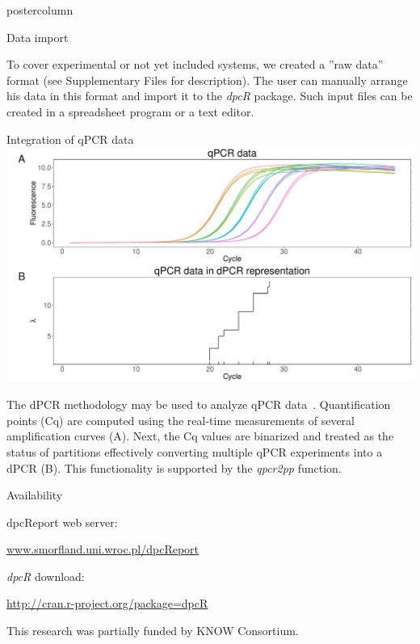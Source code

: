 \documentclass[final]{beamer}\usepackage[]{graphicx}\usepackage[]{color}
\makeatletter
\def\maxwidth{ %
  \ifdim\Gin@nat@width>\linewidth
    \linewidth
  \else
    \Gin@nat@width
  \fi
}
\newenvironment{knitrout}{}{} %
\makeatother
\begin{document}
\begin{frame}
\begin{columns}
\begin{column}{.46\textwidth}
\begin{beamercolorbox}[center,wd=\textwidth]{postercolumn}
\begin{minipage}[T]{.95\textwidth}
{\begin{block}{Data import}
\smallskip

To cover experimental or not yet included systems, we 
created a ''raw data'' format (see Supplementary Files for description). The 
user can manually arrange his data in this format and import it to the 
\textit{dpcR} package. Such input files can be created in a spreadsheet program 
or a text editor.

\end{block}
\vfill

\begin{block}{Integration of qPCR data}
\begin{knitrout}
\color{fgcolor}
\includegraphics[width=\maxwidth]{figure/qpcr2pp-1} 

\end{knitrout}

The dPCR methodology may be used to analyze qPCR data~\citep{mojtahedi_2014}.
Quantification points (Cq) are computed using the real-time measurements of 
several amplification curves (A). Next, the Cq values are binarized and treated as 
the status of partitions effectively converting multiple qPCR experiments into a 
dPCR (B). This functionality is supported by the \textit{qpcr2pp} function.
\end{block}
\vfill

\begin{block}{Availability}
\footnotesize{
dpcReport web server: 

\url{www.smorfland.uni.wroc.pl/dpcReport}

\textit{dpcR} download:

\url{http://cran.r-project.org/package=dpcR}

}

This research was partially funded by KNOW Consortium.
\end{block}
\vfill 

}
\end{minipage}
\end{beamercolorbox}
\end{column}
\end{columns}
\end{frame}
\end{document}
